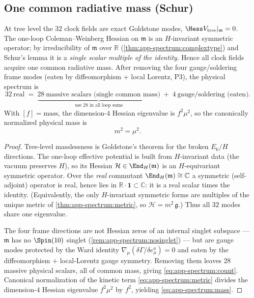 \subsection{One common radiative mass (Schur)}
\label{sec:app-spectrum:mass}

\begin{theorem}
\label{thm:app-spectrum:schurmass}
At tree level the $32$ clock fields are exact Goldstone modes,
$\Hess V_{\mathrm{tree}}|_{\mathfrak m}=0$. The one-loop Coleman--Weinberg
Hessian on $\mathfrak m$ is an $H$-invariant symmetric operator; by
irreducibility of $\mathfrak m$ over $\mathbb R$
(\autoref{thm:app-spectrum:complextype}) and Schur's lemma it is a
\emph{single scalar multiple of the identity}. Hence all clock fields
acquire one common radiative mass. After removing the four gauge/soldering
frame modes (eaten by diffeomorphism + local Lorentz, P3), the physical
spectrum is
\begin{equation}
  32\ \text{real}\;=\;\underbrace{28\ \text{massive scalars (single common mass)}}_{\text{use }28\text{ in all loop sums}}
  \;+\;4\ \text{gauge/soldering (eaten)} .
  \label{eq:app-spectrum:count}
\end{equation}
With $[f]=\mathrm{mass}$, the dimension-$4$ Hessian eigenvalue is
$f^2\mu^2$, so the canonically normalized physical mass is
\begin{equation}
  m^2=\mu^2 .
  \label{eq:app-spectrum:mass}
\end{equation}
\end{theorem}

\begin{proof}
Tree-level masslessness is Goldstone's theorem for the broken $E_6/H$
directions. The one-loop effective potential is built from $H$-invariant
data (the vacuum preserves $H$), so its Hessian
$\mathcal H\in\End_H(\mathfrak m)$ is an $H$-equivariant symmetric
operator. Over the \emph{real} commutant
$\End_H(\mathfrak m)\cong\mathbb C$ a symmetric (self-adjoint) operator is
real, hence lies in $\mathbb R\cdot\mathbf 1\subset\mathbb C$: it is a
real scalar times the identity. (Equivalently, the only $H$-invariant
symmetric forms are multiples of the unique metric of
\autoref{thm:app-spectrum:metric}, so $\mathcal H=m^2\,\mathfrak g$.) Thus
all $32$ modes share one eigenvalue.

The four frame directions are not Hessian zeros of an internal singlet
subspace --- $\mathfrak m$ has no $\Spin(10)$ singlet
(\autoref{rem:app-spectrum:nosinglet}) --- but are gauge modes protected
by the Ward identity $\nabla_\mu(\delta\Gamma/\delta e^a_\mu)=0$ and eaten
by the diffeomorphism $+$ local-Lorentz gauge symmetry. Removing them
leaves $28$ massive physical scalars, all of common mass, giving
\eqref{eq:app-spectrum:count}. Canonical normalization of the
kinetic term \eqref{eq:app-spectrum:metric} divides the dimension-$4$
Hessian eigenvalue $f^2\mu^2$ by $f^2$, yielding
\eqref{eq:app-spectrum:mass}.
\end{proof}

